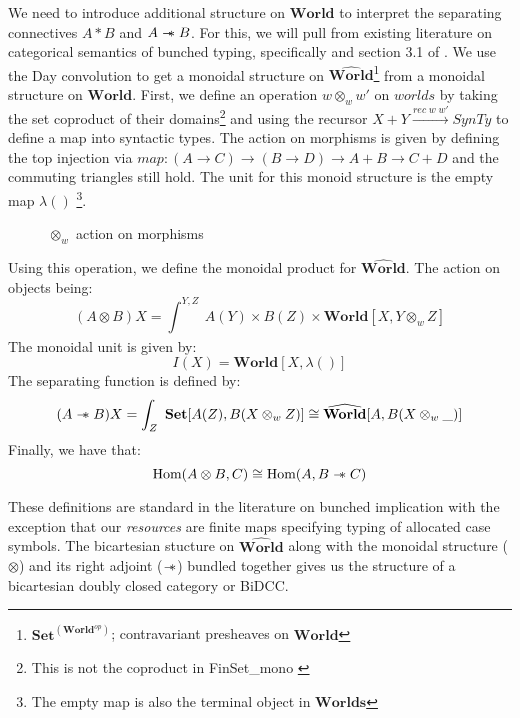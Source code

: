 \documentclass{article}
\newcommand{\sep}{\mathrel{-\mkern-6mu*}}
\newcommand{\pworld}{\widehat{\mathbf{World}}}
\newcommand{\world}{{\mathbf{World}}}
\begin{document}
  We need to introduce additional structure on $\world$ to interpret the 
  separating connectives $A * B$ and $A\sep B$. For this, we will pull 
  from existing literature on categorical semantics of bunched typing, 
  specifically \cite{ohearnResourceInterpretationsBunched1999} and section 3.1 of \cite{pym_semantics_2002}. 
  We use the Day convolution \cite{nlabDayConv} to get a monoidal structure on 
  $\pworld$\footnote{$\mathbf{Set}^{(\world^{op})}$; contravariant presheaves on $\world$} 
  from a monoidal structure on $\world$. First, we define an operation $w \otimes_w w'$ on $worlds$ by taking 
  the set coproduct of their domains\footnote{This is not the coproduct in FinSet\_mono \cite{SE-FinSetMonoCoprod}} 
  and using the recursor $X + Y \xrightarrow{rec \; w \; w'} SynTy$ 
  to define a map into syntactic types. The action on morphisms 
  is given by defining the top injection via $map : (A \rightarrow C) \rightarrow 
  (B \rightarrow D) \rightarrow A + B \rightarrow C + D$ and the commuting triangles still hold. 
  The unit for this monoid structure is the empty map $\lambda()$ 
  \footnote{The empty map is also the terminal object in $\mathbf{Worlds}$}.

\begin{figure}[!ht]
    \centering
    \caption{$\otimes_w$ action on morphisms}
\end{figure}


Using this operation, we define the monoidal product for $\pworld$. The action on objects being: 
\[
(A \otimes B) X = \int_{}^{Y,Z}\ A(Y) \times B(Z) \times \world[X,Y \otimes_w Z]
\]
The monoidal unit is given by: 
\[ 
    I(X) = \mathbf{World}[X , \lambda()]
\]
The separating function is defined by: 
\[
(A \sep B) X = \int_{Z}^{}\ \mathbf{Set}[A(Z), B(X \otimes_w Z)] \cong \pworld[A, B(X\otimes_w\_)]
\]
Finally, we have that:
\[
\textrm{Hom}(A \otimes B , C) \cong \textrm{Hom}(A , B \sep C) 
\]

These definitions are standard in the literature on bunched implication with the 
exception that our \textit{resources} are finite maps specifying typing of allocated
case symbols. The bicartesian stucture on $\pworld$ along with 
the monoidal structure ($\otimes$) and its right adjoint ($\sep$) bundled together 
gives us the structure of a bicartesian doubly closed category or BiDCC. 
\end{document}
